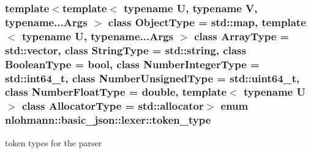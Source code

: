 \hypertarget{classnlohmann_1_1basic__json_1_1lexer_a96887d6cd131e3d3a85a9d71fbdbcdf7_a96887d6cd131e3d3a85a9d71fbdbcdf7}{
\subsubsection[{token\-\_\-type}]{\setlength{\rightskip}{0pt plus 5cm}template$<$template$<$ typename U, typename V, typename...\-Args $>$ class Object\-Type = std\-::map, template$<$ typename U, typename...\-Args $>$ class Array\-Type = std\-::vector, class String\-Type  = std\-::string, class Boolean\-Type  = bool, class Number\-Integer\-Type  = std\-::int64\-\_\-t, class Number\-Unsigned\-Type  = std\-::uint64\-\_\-t, class Number\-Float\-Type  = double, template$<$ typename U $>$ class Allocator\-Type = std\-::allocator$>$ enum {\bf nlohmann\-::basic\-\_\-json\-::lexer\-::token\-\_\-type}\hspace{0.3cm}{\ttfamily [strong]}}}\label{classnlohmann_1_1basic__json_1_1lexer_a96887d6cd131e3d3a85a9d71fbdbcdf7_a96887d6cd131e3d3a85a9d71fbdbcdf7}


token types for the parser 

